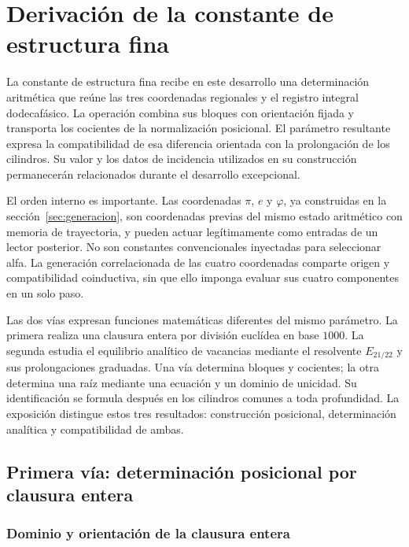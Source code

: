\section{Derivación de la constante de estructura fina}
\label{sec:alpha}

La constante de estructura fina recibe en este desarrollo una determinación
aritmética que reúne las tres coordenadas regionales y el registro integral
dodecafásico. La operación combina sus bloques con orientación fijada y
transporta los cocientes de la normalización posicional. El parámetro
resultante expresa la compatibilidad de esa diferencia orientada con
la prolongación de los cilindros. Su valor y los datos de incidencia
utilizados en su construcción permanecerán relacionados durante el
desarrollo excepcional.

El orden interno es importante. Las coordenadas \(\pi\),
\(e\) y \(\varphi\), ya construidas en la sección~\ref{sec:generacion}, son coordenadas
previas del mismo estado aritmético con memoria de trayectoria, y pueden actuar legítimamente como
entradas de un lector posterior. No son constantes convencionales
inyectadas para seleccionar alfa. La generación correlacionada de las cuatro coordenadas comparte origen y
compatibilidad coinductiva, sin que ello imponga evaluar sus cuatro
componentes en un solo paso.

Las dos vías expresan funciones matemáticas diferentes del mismo parámetro.
La primera realiza una clausura entera por división euclídea en base
\(1000\). La segunda estudia el equilibrio analítico de vacancias mediante
el resolvente \(E_{21/22}\) y sus prolongaciones graduadas. Una vía
determina bloques y cocientes; la otra determina una raíz mediante una
ecuación y un dominio de unicidad. Su identificación se formula después
en los cilindros comunes a toda profundidad. La exposición distingue
estos tres resultados: construcción posicional, determinación analítica
y compatibilidad de ambas.

\subsection{Primera vía: determinación posicional por clausura entera}
\subsubsection{Dominio y orientación de la clausura entera}
\label{subsec:alpha-dominio}

